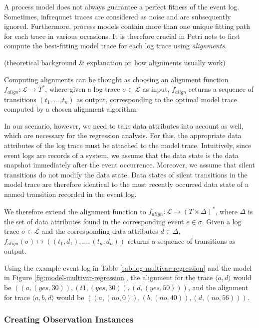 A process model does not always guarantee a perfect fitness of the event log. Sometimes, infrequnet traces are considered as noise and are subsequently ignored. Furthermore, process models contain more than one unique fitting path for each trace in various occasions. It is therefore crucial in Petri nets to first compute the best-fitting model trace for each log trace using \emph{alignments.} 

(theoretical background \& explanation on how alignments usually work)

Computing alignments can be thought as choosing an alignment function $f_{align}: \mathcal{L} \rightarrow T^*$, where given a log trace $\sigma \in \mathcal{L}$ as input, $f_{align}$ returns a sequence of transitions $(t_1, \dots, t_n)$ as output, corresponding to the optimal model trace computed by a chosen alignment algorithm.

In our scenario, however, we need to take data attributes into account as well, which are necessary for the regression analysis. For this, the appropriate data attributes of the log trace must be attached to the model trace. Intuitively, since event logs are records of a system, we assume that the data state is the data snapshot immediately after the event occurrence. Moreover, we assume that silent transitions do not modify the data state. Data states of silent transitions in the model trace are therefore identical to the most recently occurred data state of a named transition recorded in the event log.

We therefore extend the alignment function to $f_{align}: \mathcal{L} \rightarrow (T \times \Delta)^*$, where $\Delta$ is the set of data attributes found in the corresponding event $e \in \sigma$. Given a log trace $\sigma \in \mathcal{L}$ and the corresponding data attributes $d \in \Delta$, $f_{align}(\sigma) \mapsto ((t_1, d_1), \dots, (t_n, d_n))$ returns a sequence of transitions as output.

Using the example event log in Table \ref{tab:log-multivar-regression} and the model in Figure \ref{fig:model-multivar-regression}, the alignment for the trace $\langle a, d \rangle$ would be $((a, (yes, 30)), (t1, (yes, 30)), (d, (yes, 50)))$, and the alignment for trace $\langle a, b, d \rangle$ would be $((a, (no, 0)), (b, (no, 40)), (d, (no, 56)))$.

\subsubsection*{Creating Observation Instances}

